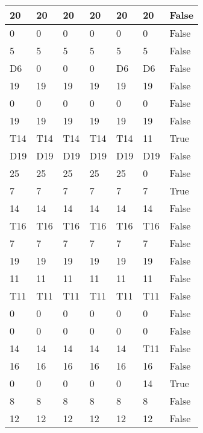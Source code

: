 \begin{longtable}[htbp]{| p{} | p{} | p{}| p{}| p{}| p{}| p{}|}
20 & 20 & 20 & 20 & 20 & 20 & False \\ \hline
0 & 0 & 0 & 0 & 0 & 0 & False \\ \hline
5 & 5 & 5 & 5 & 5 & 5 & False \\ \hline
\multicolumn{1}{|l|}{D6} & 0 & 0 & 0 & \multicolumn{1}{l|}{D6} & \multicolumn{1}{l|}{D6} & False \\ \hline
19 & 19 & 19 & 19 & 19 & 19 & False \\ \hline
0 & 0 & 0 & 0 & 0 & 0 & False \\ \hline
19 & 19 & 19 & 19 & 19 & 19 & False \\ \hline
\multicolumn{1}{|l|}{T14} & \multicolumn{1}{l|}{T14} & \multicolumn{1}{l|}{T14} & \multicolumn{1}{l|}{T14} & \multicolumn{1}{l|}{T14} & 11 & True \\ \hline
\multicolumn{1}{|l|}{D19} & \multicolumn{1}{l|}{D19} & \multicolumn{1}{l|}{D19} & \multicolumn{1}{l|}{D19} & \multicolumn{1}{l|}{D19} & \multicolumn{1}{l|}{D19} & False \\ \hline
25 & 25 & 25 & 25 & 25 & 0 & False \\ \hline
7 & 7 & 7 & 7 & 7 & 7 & True \\ \hline
14 & 14 & 14 & 14 & 14 & 14 & False \\ \hline
\multicolumn{1}{|l|}{T16} & \multicolumn{1}{l|}{T16} & \multicolumn{1}{l|}{T16} & \multicolumn{1}{l|}{T16} & \multicolumn{1}{l|}{T16} & \multicolumn{1}{l|}{T16} & False \\ \hline
7 & 7 & 7 & 7 & 7 & 7 & False \\ \hline
19 & 19 & 19 & 19 & 19 & 19 & False \\ \hline
11 & 11 & 11 & 11 & 11 & 11 & False \\ \hline
\multicolumn{1}{|l|}{T11} & \multicolumn{1}{l|}{T11} & \multicolumn{1}{l|}{T11} & \multicolumn{1}{l|}{T11} & \multicolumn{1}{l|}{T11} & \multicolumn{1}{l|}{T11} & False \\ \hline
0 & 0 & 0 & 0 & 0 & 0 & False \\ \hline
0 & 0 & 0 & 0 & 0 & 0 & False \\ \hline
14 & 14 & 14 & 14 & 14 & \multicolumn{1}{l|}{T11} & False \\ \hline
16 & 16 & 16 & 16 & 16 & 16 & False \\ \hline
0 & 0 & 0 & 0 & 0 & 14 & True \\ \hline
8 & 8 & 8 & 8 & 8 & 8 & False \\ \hline
12 & 12 & 12 & 12 & 12 & 12 & False \\ \hline

\end{longtable}
